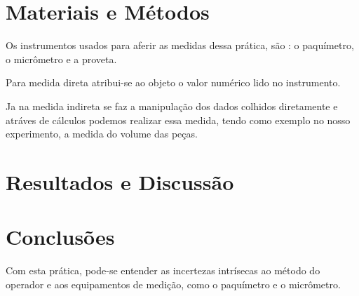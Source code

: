 \documentclass[a4paper, 12pt]{article}
\begin{document}
\section{Materiais e Métodos}
Os instrumentos usados para aferir as medidas dessa prática, são : o paquímetro, o micrômetro e a proveta.

Para medida direta atribui-se ao objeto o valor numérico lido no instrumento.

Ja na medida indireta se faz a manipulação dos dados colhidos diretamente e atráves de cálculos podemos realizar essa medida, tendo como exemplo no nosso experimento, a medida do volume das peças.
\section{Resultados e Discussão}
\section{Conclusões}
Com esta prática, pode-se entender as incertezas intrísecas ao método do operador e aos equipamentos de medição, como o paquímetro e o micrômetro.
\end{document}
